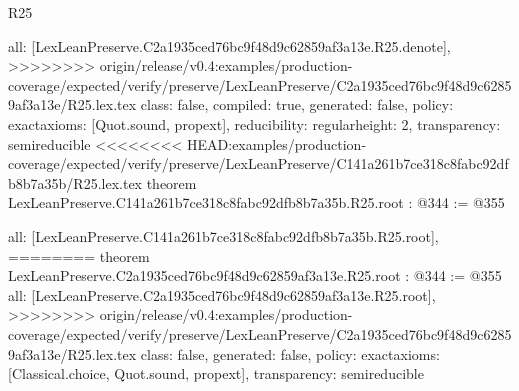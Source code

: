\begin{lexlean}{R25}
\begin{coremodule}
{{{{{  all: [LexLeanPreserve.C2a1935ced76bc9f48d9c62859af3a13e.R25.denote],
>>>>>>>> origin/release/v0.4:examples/production-coverage/expected/verify/preserve/LexLeanPreserve/C2a1935ced76bc9f48d9c62859af3a13e/R25.lex.tex
  class: false,
  compiled: true,
  generated: false,
  policy: exact{axioms: [Quot.sound, propext]},
  reducibility: regular{height: 2},
  transparency: semireducible
}
<<<<<<<< HEAD:examples/production-coverage/expected/verify/preserve/LexLeanPreserve/C141a261b7ce318c8fabc92dfb8b7a35b/R25.lex.tex
theorem LexLeanPreserve.C141a261b7ce318c8fabc92dfb8b7a35b.R25.root : @344 := @355 {
  all: [LexLeanPreserve.C141a261b7ce318c8fabc92dfb8b7a35b.R25.root],
========
theorem LexLeanPreserve.C2a1935ced76bc9f48d9c62859af3a13e.R25.root : @344 := @355 {
  all: [LexLeanPreserve.C2a1935ced76bc9f48d9c62859af3a13e.R25.root],
>>>>>>>> origin/release/v0.4:examples/production-coverage/expected/verify/preserve/LexLeanPreserve/C2a1935ced76bc9f48d9c62859af3a13e/R25.lex.tex
  class: false,
  generated: false,
  policy: exact{axioms: [Classical.choice, Quot.sound, propext]},
  transparency: semireducible
}

}}}}}
\end{coremodule}
\end{lexlean}
